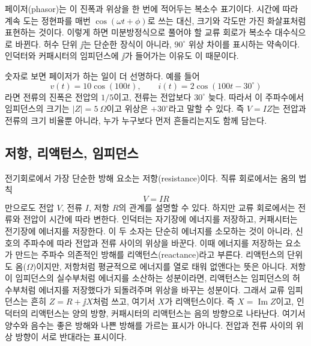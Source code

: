 페이저(phasor)는 이 진폭과 위상을 한 번에 적어두는 복소수 표기이다.
시간에 따라 계속 도는 정현파를 매번 $\cos(\omega t+\phi)$로 쓰는 대신, 크기와 각도만 가진 화살표처럼 표현하는 것이다.
이렇게 하면 미분방정식으로 풀어야 할 교류 회로가 복소수 대수식으로 바뀐다.
허수 단위 $\jj$는 단순한 장식이 아니라, $90^\circ$ 위상 차이를 표시하는 약속이다.
인덕터와 커패시터의 임피던스에 $\jj$가 들어가는 이유도 이 때문이다.

숫자로 보면 페이저가 하는 일이 더 선명하다.
예를 들어
\begin{equation}
  v(t)=10\cos(100t), \qquad i(t)=2\cos(100t-30^\circ)
\end{equation}
라면 전류의 진폭은 전압의 $1/5$이고, 전류는 전압보다 $30^\circ$ 늦다.
따라서 이 주파수에서 임피던스의 크기는 $|Z|=5~\Omega$이고 위상은 $+30^\circ$라고 말할 수 있다.
즉 $V=IZ$는 전압과 전류의 크기 비율뿐 아니라, 누가 누구보다 먼저 흔들리는지도 함께 담는다.

\subsection{저항, 리액턴스, 임피던스}

전기회로에서 가장 단순한 방해 요소는 저항(resistance)이다.
직류 회로에서는 옴의 법칙
\begin{equation}
  V = I R
\end{equation}
만으로도 전압 $V$, 전류 $I$, 저항 $R$의 관계를 설명할 수 있다.
하지만 교류 회로에서는 전류와 전압이 시간에 따라 변한다.
인덕터는 자기장에 에너지를 저장하고, 커패시터는 전기장에 에너지를 저장한다.
이 두 소자는 단순히 에너지를 소모하는 것이 아니라, 신호의 주파수에 따라 전압과 전류 사이의 위상을 바꾼다.
이때 에너지를 저장하는 요소가 만드는 주파수 의존적인 방해를 리액턴스(reactance)라고 부른다.
리액턴스의 단위도 옴($\Omega$)이지만, 저항처럼 평균적으로 에너지를 열로 태워 없앤다는 뜻은 아니다.
저항이 임피던스의 실수부처럼 에너지를 소산하는 성분이라면, 리액턴스는 임피던스의 허수부처럼 에너지를 저장했다가 되돌려주며 위상을 바꾸는 성분이다.
그래서 교류 임피던스는 흔히 $Z=R+\jj X$처럼 쓰고, 여기서 $X$가 리액턴스이다.
즉 $X=\operatorname{Im}Z$이고, 인덕터의 리액턴스는 양의 방향, 커패시터의 리액턴스는 음의 방향으로 나타난다.
여기서 양수와 음수는 좋은 방해와 나쁜 방해를 가르는 표시가 아니다.
전압과 전류 사이의 위상 방향이 서로 반대라는 표시이다.

